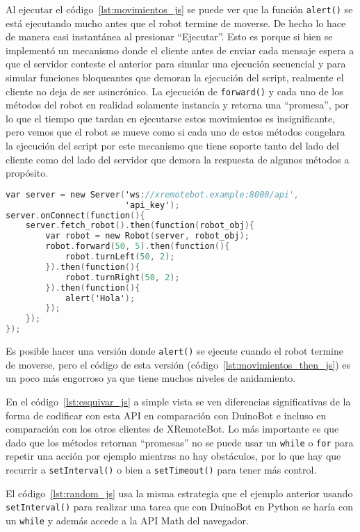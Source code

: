 Al ejecutar el código~\ref{lst:movimientos_js} se puede ver que la
función \texttt{alert()} se está ejecutando mucho antes que el
robot termine de moverse. De hecho lo hace de manera casi instantánea
al presionar ``Ejecutar''. Esto es porque
si bien se implementó un mecanismo donde el cliente
antes de enviar cada mensaje espera a que el servidor conteste el
anterior para simular una ejecución secuencial y para simular
funciones bloqueantes que demoran la ejecución del script, realmente
el cliente no deja de ser asincrónico.
La ejecución de \texttt{forward()} y cada uno de los
métodos del robot en realidad solamente instancia y retorna una
``promesa'', por lo que el tiempo que tardan en ejecutarse
estos movimientos es insignificante, pero vemos que el robot
se mueve como si cada uno de estos métodos congelara la ejecución
del script por este mecanismo que tiene soporte tanto del lado
del cliente como del lado del servidor que demora la respuesta
de algunos métodos a propósito.

\begin{lstlisting}[language=C,
caption={Secuencia de movimientos usando \texttt{Promise\#then()}},
label=lst:movimientos_then_js]
var server = new Server('ws://xremotebot.example:8000/api',
                        'api_key');
server.onConnect(function(){
    server.fetch_robot().then(function(robot_obj){
        var robot = new Robot(server, robot_obj);
        robot.forward(50, 5).then(function(){
            robot.turnLeft(50, 2);
        }).then(function(){
            robot.turnRight(50, 2);
        }).then(function(){
            alert('Hola');
        });
    });
});
\end{lstlisting}

Es posible hacer una versión donde \texttt{alert()} se ejecute cuando
el robot termine de moverse, pero el código de esta versión
(código~\ref{lst:movimientos_then_js}) es
un poco más engorroso ya que tiene muchos niveles de anidamiento.

En el código~\ref{lst:esquivar_js} a simple vista se ven diferencias
significativas de la forma de codificar con esta API en comparación
con DuinoBot e incluso en comparación con los otros clientes de
XRemoteBot. Lo más importante es que dado que los métodos retornan
``promesas'' no se puede usar un \texttt{while} o \texttt{for} para
repetir una acción por ejemplo mientras no hay obstáculos, por lo que
hay que recurrir a \texttt{setInterval()} o bien a \texttt{setTimeout()}
para tener más control.

El código~\ref{lst:random_js} usa la misma estrategia que el ejemplo
anterior usando \texttt{setInterval()} para realizar una tarea
que con DuinoBot en Python se haría con un \texttt{while} y además
accede a la API Math del navegador.

